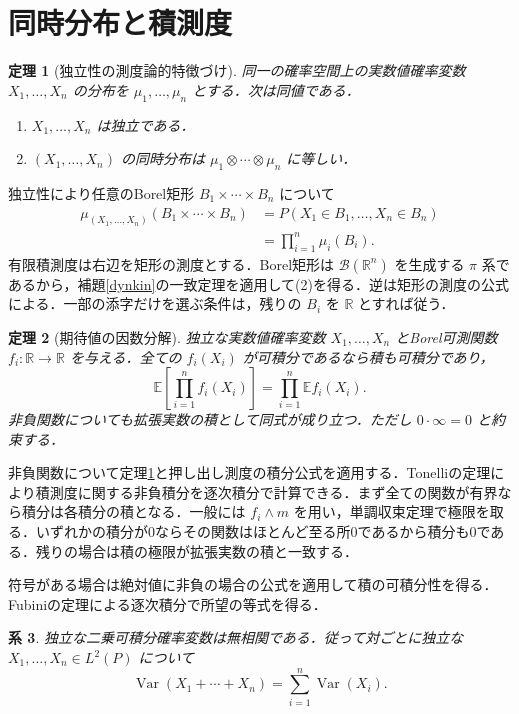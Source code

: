 \documentclass[a5paper,10pt,onecolumn]{jsarticle}
\makeatletter
\theoremstyle{mathnotetheorem}
\newtheorem{theorem}{定理}[section]
\newtheorem{corollary}[theorem]{系}
\renewcommand{\proofname}{証明}
\renewenvironment{proof}[1][\proofname]{%
  \par\pushQED{\qed}\normalfont\topsep4\p@\@plus2\p@\relax
  \trivlist\item[\hskip\labelsep\bfseries #1]\ignorespaces
}{\popQED\endtrivlist\@endpefalse}
\newcommand{\R}{\mathbb{R}}
\newcommand{\B}{\mathcal B}
\newcommand{\E}{\mathbb E}
\newcommand{\1}{\mathbf{1}}
\DeclareMathOperator{\Var}{Var}
\makeatother
\begin{document}
\section{同時分布と積測度}
\begin{theorem}[独立性の測度論的特徴づけ]\label{prod}
同一の確率空間上の実数値確率変数 $X_1,\ldots,X_n$ の分布を $\mu_1,\ldots,\mu_n$ とする．次は同値である．
\begin{enumerate}
\item $X_1,\ldots,X_n$ は独立である．
\item $(X_1,\ldots,X_n)$ の同時分布は $\mu_1\otimes\cdots\otimes\mu_n$ に等しい．
\end{enumerate}
\end{theorem}
\begin{proof}
独立性により任意のBorel矩形 $B_1\times\cdots\times B_n$ について
\begin{align*}
 \mu_{(X_1,\ldots,X_n)}(B_1\times\cdots\times B_n)
 &=P(X_1\in B_1,\ldots,X_n\in B_n)\\
 &=\prod_{i=1}^n\mu_i(B_i).
\end{align*}
有限積測度は右辺を矩形の測度とする．Borel矩形は $\B(\R^n)$ を生成する $\pi$ 系であるから，補題\ref{dynkin}の一致定理を適用して(2)を得る．逆は矩形の測度の公式による．一部の添字だけを選ぶ条件は，残りの $B_i$ を $\R$ とすれば従う．
\end{proof}
\begin{theorem}[期待値の因数分解]\label{factor}
独立な実数値確率変数 $X_1,\ldots,X_n$ とBorel可測関数 $f_i:\R\to\R$ を与える．全ての $f_i(X_i)$ が可積分であるなら積も可積分であり，
\[
 \E\left[\prod_{i=1}^nf_i(X_i)\right]=\prod_{i=1}^n\E f_i(X_i).
\]
非負関数についても拡張実数の積として同式が成り立つ．ただし $0\cdot\infty=0$ と約束する．
\end{theorem}
\begin{proof}
非負関数について定理\ref{prod}と押し出し測度の積分公式を適用する．Tonelliの定理により積測度に関する非負積分を逐次積分で計算できる．まず全ての関数が有界なら積分は各積分の積となる．一般には $f_i\wedge m$ を用い，単調収束定理で極限を取る．いずれかの積分が0ならその関数はほとんど至る所0であるから積分も0である．残りの場合は積の極限が拡張実数の積と一致する．

符号がある場合は絶対値に非負の場合の公式を適用して積の可積分性を得る．Fubiniの定理による逐次積分で所望の等式を得る．
\end{proof}
\begin{corollary}
独立な二乗可積分確率変数は無相関である．従って対ごとに独立な $X_1,\ldots,X_n\in L^2(P)$ について
\[
 \Var(X_1+\cdots+X_n)=\sum_{i=1}^n\Var(X_i).
\]
\end{corollary}
\end{document}
